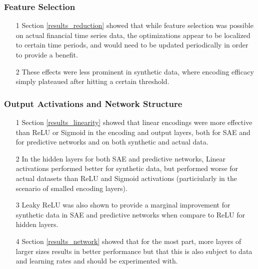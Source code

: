 \documentclass[a4paper,11pt,oneside]{article}
\theoremstyle{plain}
\theoremstyle{definition}
\begin{document}
	\subsubsection{Feature Selection}
	\begin{itemize}
		\item[1] Section \ref{results_reduction} showed that while feature selection was possible on actual financial time series data, the optimizations appear to be localized to certain time periods, and would need to be updated periodically in order to provide a benefit.
		\item[2] These effects were less prominent in synthetic data, where encoding efficacy simply plateaued after hitting a certain threshold.
	\end{itemize}
	
	\subsubsection{Output Activations and Network Structure}
	\begin{itemize}
		\item[1] Section \ref{results_linearity} showed that linear encodings were more effective than ReLU or Sigmoid in the encoding and output layers, both for SAE and for predictive networks and on both synthetic and actual data.
		\item[2] In the hidden layers for both SAE and predictive networks, Linear activations performed better for synthetic data, but performed worse for actual datasets than ReLU and Sigmoid activations (particiularly in the scenario of smalled encoding layers).
		\item[3] Leaky ReLU was also shown to provide a marginal improvement for synthetic data in SAE and predictive networks when compare to ReLU for hidden layers.
		\item[4] Section \ref{results_network} showed that for the most part, more layers of larger sizes results in better performance but that this is also subject to data and learning rates and should be experimented with.
	\end{itemize}
	
\end{document}
